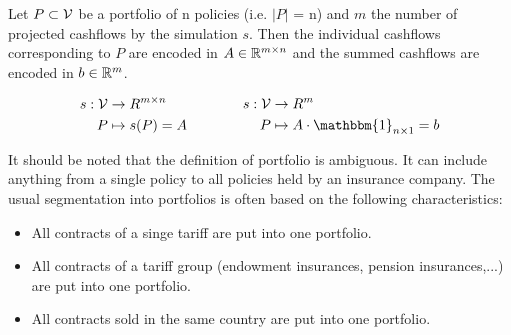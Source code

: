 \begin{definition}
	Let $P \subset \mathcal{V}$ be a portfolio of n policies (i.e. $\vert P \vert$ = n) and $m$ the number of projected cashflows by the simulation $s$. Then the individual cashflows corresponding to $P$ are encoded in $A \in \mathbb{R}^{m \times n}$ and the summed cashflows are encoded in $b \in \mathbb{R}^m$.

	\begin{equation*}
	\begin{aligned}[c]
	s: \V &\rightarrow R^{m \times n}\\
		P & \mapsto s(P)=A\\
	\end{aligned}
	\qquad \qquad
	\begin{aligned}[c]
	s: \V &\rightarrow R^m\\
		P & \mapsto A \cdot \mathbbm{1}_{n \times 1} = b \\
	\end{aligned}
	\end{equation*}
	
\end{definition}

\begin{remark}
	It should be noted that the definition of portfolio is ambiguous. It can include anything from a single policy to all policies held by an insurance company. The usual segmentation into portfolios is often based on the following characteristics:
	\begin{itemize}
		\item All contracts of a singe tariff are put into one portfolio.
		\item All contracts of a tariff group (endowment insurances, pension insurances,...) are put into one portfolio. 
		\item All contracts sold in the same country are put into one portfolio.
	\end{itemize} 
\end{remark}

